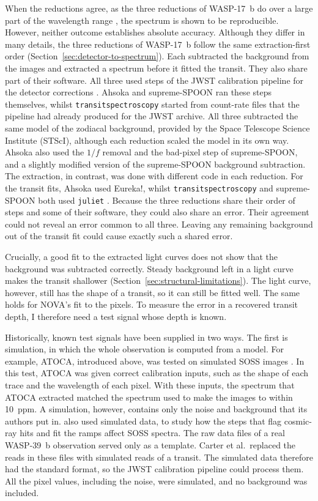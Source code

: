 When the reductions agree, as the three reductions of WASP-17~b do over a
large part of the wavelength range \citep{LouieEtAl2025}, the spectrum is
shown to be reproducible. However, neither outcome establishes absolute
accuracy. Although they differ in many details, the three reductions of WASP-17~b follow the same extraction-first order
(Section~\ref{sec:detector-to-spectrum}). Each subtracted the background from
the images and extracted a spectrum before it fitted the transit. They also
share part of their software. All three used steps of the JWST calibration
pipeline for the detector corrections
\citep{JWSTPipeline2025,RadicaEtAl2023,LouieEtAl2025}. Ahsoka and supreme-SPOON ran these steps themselves, whilst \texttt{transitspectroscopy} started from count-rate files that
the pipeline had already produced for the JWST archive. All three subtracted
the same model of the zodiacal background, provided by the Space Telescope
Science Institute (STScI), although each reduction scaled the model in its own
way. Ahsoka also used the $1/f$ removal and the bad-pixel step of
supreme-SPOON, and a slightly modified version of the supreme-SPOON background
subtraction. The extraction, in contrast, was done with different code in
each reduction. For the transit fits, Ahsoka used Eureka!, whilst
\texttt{transitspectroscopy} and supreme-SPOON both used \texttt{juliet}
\citep{LouieEtAl2025}. Because the three reductions share their order of steps and some of their software, they could also share an error. Their agreement could not reveal an error common to all three. Leaving any remaining background out of the transit fit could cause exactly such a shared error.

Crucially, a good fit to the extracted light curves does not show that the
background was subtracted correctly. Steady background left in a light curve
makes the transit shallower (Section~\ref{sec:structural-limitations}). The
light curve, however, still has the shape of a transit, so it can still be
fitted well. The same holds for NOVA's fit to the pixels. To measure the error
in a recovered transit depth, I therefore need a test signal whose depth is
known.

Historically, known test signals have been supplied in two ways. The first is
simulation, in which the whole observation is computed from a model. For
example, ATOCA, introduced above, was tested on simulated SOSS images
\citep{DarveauBernierEtAl2022}. In this test, ATOCA was given correct
calibration inputs, such as the shape of each trace and the wavelength of each
pixel. With these inputs, the spectrum that ATOCA extracted matched the
spectrum used to make the images to within 10~ppm. A simulation, however,
contains only the noise and background that its authors put in.
\citet{CarterEtAl2025} also used simulated data, to study how the steps that
flag cosmic-ray hits and fit the ramps affect SOSS spectra. The raw data files
of a real WASP-39~b observation served only as a template. Carter et al.\
replaced the reads in these files with simulated reads of a transit. The
simulated data therefore had the standard format, so the JWST calibration
pipeline could process them. All the pixel values, including the noise, were
simulated, and no background was included.

